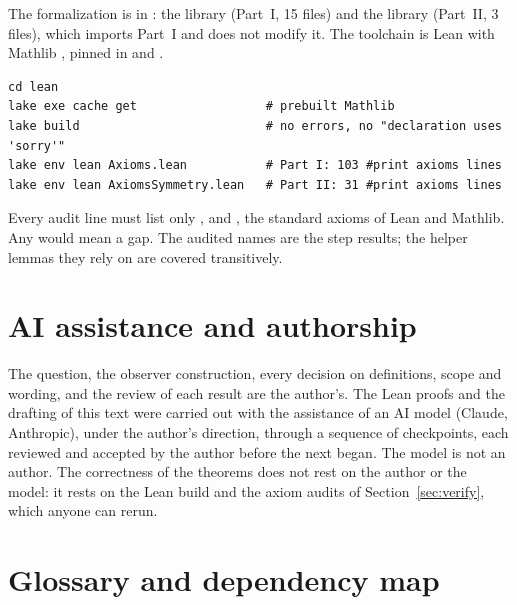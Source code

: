 \documentclass[11pt]{article}
\theoremstyle{definition}
\theoremstyle{plain}
\theoremstyle{remark}
\begin{document}
{\sloppy The formalization is in : the library  (Part~I, 15 files) and the library  (Part~II, 3 files), which imports Part~I and does not modify it. The toolchain is Lean  with Mathlib , pinned in  and .\par}
\begin{verbatim}
cd lean
lake exe cache get                  # prebuilt Mathlib
lake build                          # no errors, no "declaration uses 'sorry'"
lake env lean Axioms.lean           # Part I: 103 #print axioms lines
lake env lean AxiomsSymmetry.lean   # Part II: 31 #print axioms lines
\end{verbatim}
Every audit line must list only ,  and , the standard axioms of Lean and Mathlib. Any  would mean a gap. The audited names are the step results; the helper lemmas they rely on are covered transitively.

\section{AI assistance and authorship}\label{sec:ai}

The question, the observer construction, every decision on definitions, scope and wording, and the review of each result are the author's. The Lean proofs and the drafting of this text were carried out with the assistance of an AI model (Claude, Anthropic), under the author's direction, through a sequence of checkpoints, each reviewed and accepted by the author before the next began. The model is not an author. The correctness of the theorems does not rest on the author or the model: it rests on the Lean build and the axiom audits of Section~\ref{sec:verify}, which anyone can rerun.

\appendix
\section{Glossary and dependency map}\label{app:glossary}
\end{document}
